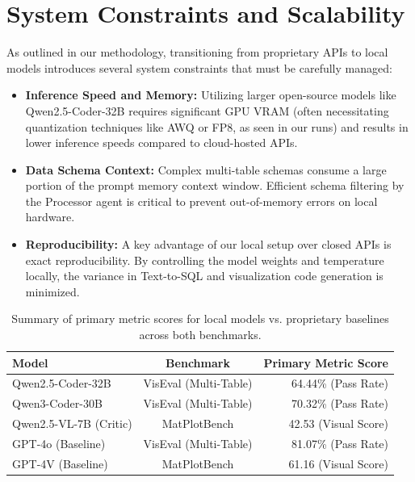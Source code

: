 \documentclass[a4paper,oneside,bibliography=totoc]{scrbook}
\begin{document}
\section*{System Constraints and Scalability}
As outlined in our methodology, transitioning from proprietary APIs to local models introduces several system constraints that must be carefully managed:
\begin{itemize}
    \item \textbf{Inference Speed and Memory:} Utilizing larger open-source models like Qwen2.5-Coder-32B requires significant GPU VRAM (often necessitating quantization techniques like AWQ or FP8, as seen in our runs) and results in lower inference speeds compared to cloud-hosted APIs.
    \item \textbf{Data Schema Context:} Complex multi-table schemas consume a large portion of the prompt memory context window. Efficient schema filtering by the Processor agent is critical to prevent out-of-memory errors on local hardware.
    \item \textbf{Reproducibility:} A key advantage of our local setup over closed APIs is exact reproducibility. By controlling the model weights and temperature locally, the variance in Text-to-SQL and visualization code generation is minimized.
\end{itemize}

\begin{table}[h!]
 \centering
 \begin{tabular}{lcr}
 \toprule
 \textbf{Model} & \textbf{Benchmark} & \textbf{Primary Metric Score} \\
 \midrule
 Qwen2.5-Coder-32B & VisEval (Multi-Table) & 64.44\% (Pass Rate) \\
 Qwen3-Coder-30B & VisEval (Multi-Table) & 70.32\% (Pass Rate) \\
 Qwen2.5-VL-7B (Critic) & MatPlotBench & 42.53 (Visual Score) \\
 GPT-4o (Baseline) & VisEval (Multi-Table) & 81.07\% (Pass Rate) \\
 GPT-4V (Baseline) & MatPlotBench & 61.16 (Visual Score) \\
 \bottomrule
 \end{tabular}
 \caption{Summary of primary metric scores for local models vs. proprietary baselines across both benchmarks.}
 \label{tab:summary_results}
\end{table}

\end{document}
